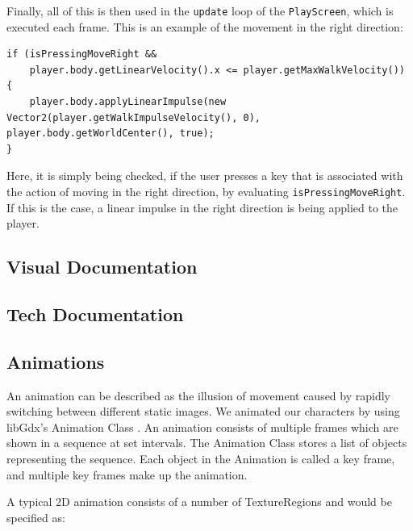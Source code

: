 \documentclass[12p]{article}
\begin{document}
Finally, all of this is then used in the \texttt{update} loop of the \texttt{PlayScreen}, which is executed each frame. This is an example of the movement in the right direction:

\begin{verbatim}
if (isPressingMoveRight &&
    player.body.getLinearVelocity().x <= player.getMaxWalkVelocity()) 
{
    player.body.applyLinearImpulse(new Vector2(player.getWalkImpulseVelocity(), 0), player.body.getWorldCenter(), true);
}
\end{verbatim}

Here, it is simply being checked, if the user presses a key that is associated with the action of moving in the right direction, by evaluating \texttt{isPressingMoveRight}. If this is the case, a linear impulse in the right direction is being applied to the player.


\subsection{Visual Documentation}


\subsection{Tech Documentation}


\subsection{Animations}

An animation can be described as the illusion of movement caused by rapidly switching between different static images. We animated our characters by using libGdx's Animation Class \cite{libGdxAnimClass}. An animation consists of multiple frames which are shown in a sequence at set intervals.  The Animation Class stores a list of objects representing the sequence. Each object in the Animation is called a key frame, and multiple key frames make up the animation.

A typical 2D animation consists of a number of TextureRegions and would be specified as:

\end{document}
